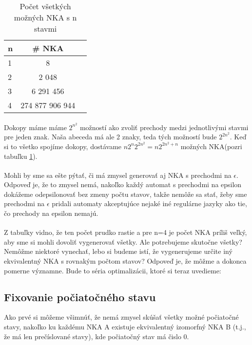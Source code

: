 \begin{table}[h]
  \centering
  \begin{tabular}{|l|c|r|}
    \hline
    n & \# NKA \\
    \hline
    1 & 8 \\ 
    \hline
    2 & 2 048 \\ 
    \hline
    3 & 6 291 456 \\
    \hline
    4 & 274 877 906 944 \\
    \hline
  \end{tabular}
  \caption{Počet všetkých možných NKA s n stavmi}
  \label{tab:pocVsNKA}
\end{table}
\paragraph{}


Dokopy máme máme $2^{n^2}$ možností ako zvoliť prechody medzi jednotlivými stavmi pre jeden znak. Naša abeceda má ale 2 znaky, teda tých možností bude $2^{2n^2}$. Keď si to všetko spojíme dokopy, dostávame $n2^n2^{2n^2} = n2^{2n^2 + n}$ možných NKA(pozri tabuľku \ref{tab:pocVsNKA}).

\paragraph{}
Mohli by sme sa ešte pýtať, či má zmysel generovať aj NKA s prechodmi na $\epsilon$. Odpoveď je, že to zmysel nemá, nakoľko každý automat s prechodmi na epsilon dokážeme odepsilonovať bez zmeny počtu stavov, takže nemôže sa stať, žeby sme prechodmi na $\epsilon$ pridali automaty akceptujúce nejaké iné regulárne jazyky ako tie, čo prechody na epsilon nemajú.

\paragraph{}
Z tabuľky vidno, že ten počet prudko rastie a pre n=4 je počet NKA príliš veľký, aby sme si mohli dovoliť vygenerovať všetky. Ale potrebujeme skutočne všetky? Nemôžme niektoré vynechať, lebo si budeme istí, že vygenerujeme určite iný ekvivalentný NKA s rovnakým počtom stavov? Odpoveď je, že môžme a dokonca pomerne významne. Bude to séria optimalizácii, ktoré si teraz uvedieme:

\subsection{Fixovanie počiatočného stavu} Ako prvé si môžeme všimnúť, že nemá zmysel skúšať všetky možné počiatočné stavy, nakoľko ku každému NKA A existuje ekvivalentný izomorfný NKA B (t.j., že má len prečíslované stavy), kde počiatočný stav má čislo 0.


